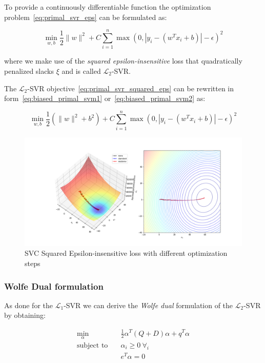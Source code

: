 To provide a continuously differentiable function the optimization problem~\eqref{eq:primal_svr_eps} can be formulated as:

\begin{equation} \label{eq:primal_svr_squared_eps}
    \min_{w,b} \frac{1}{2} \| w \|^2 + C \sum_{i=1}^n \max(0, |y_i - (w^T x_i + b)| - \epsilon)^2
\end{equation}

where we make use of the \emph{squared epsilon-insensitive} loss that quadratically penalized slacks $\xi$ and is called $\mathcal{L}_2$-SVR.

The $\mathcal{L}_2$-SVR objective~\eqref{eq:primal_svr_squared_eps} can be rewritten in form~\eqref{eq:biased_primal_svm1} or~\eqref{eq:biased_primal_svm2} as:

\begin{equation} \label{eq:biased_primal_svr_squared_eps}
	\min_{w,b} \frac{1}{2} (\| w \|^2 + b^2) + C \sum_{i=1}^n \max(0, |y_i - (w^T x_i + b)| - \epsilon)^2
\end{equation}

\begin{figure}[h!]
	\centering
  	\includegraphics[scale=0.4]{img/svr_squared_eps_loss}
  	\caption{SVC Squared Epsilon-insensitive loss with different optimization steps}
  	\label{fig:svr_squared_eps_loss}
\end{figure}

\subsubsection{Wolfe Dual formulation}

As done for the $\mathcal{L}_1$-SVR we can derive the \emph{Wolfe dual} formulation of the $\mathcal{L}_2$-SVR by obtaining:

\begin{equation} \label{eq:wolfe_dual_svr_squared_eps}
    \begin{aligned}
        \min_{\alpha} \quad & \frac{1}{2} \alpha^T (Q + D) \alpha + q^T \alpha \\
            \text{subject to} \quad & \alpha_i \geq 0 \ \forall_i \\ & e^T \alpha=0
    \end{aligned}
\end{equation}

